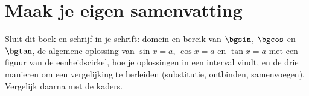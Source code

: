 \begin{oefeningen}


\end{oefeningen}


\begin{oefeningen}






\end{oefeningen}


\ifzelfstudie
\section*{Maak je eigen samenvatting}
Sluit dit boek en schrijf in je schrift: domein en bereik van $\bgsin$, $\bgcos$ en $\bgtan$, de algemene oplossing van $\sin x = a$, $\cos x = a$ en $\tan x = a$ met een figuur van de eenheidscirkel, hoe je oplossingen in een interval vindt, en de drie manieren om een vergelijking te herleiden (substitutie, ontbinden, samenvoegen). Vergelijk daarna met de kaders.
\fi

